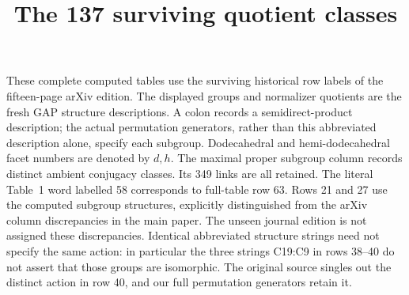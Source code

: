 \documentclass[10pt,a4paper]{article}
\title{The 137 surviving quotient classes}
\author{}\date{}
\begin{document}
\maketitle
These complete computed tables use the surviving historical row labels of the fifteen-page arXiv edition. The displayed groups and normalizer quotients are the fresh GAP structure descriptions. A colon records a semidirect-product description; the actual permutation generators, rather than this abbreviated description alone, specify each subgroup. Dodecahedral and hemi-dodecahedral facet numbers are denoted by $d,h$. The maximal proper subgroup column records distinct ambient conjugacy classes. Its 349 links are all retained. The literal Table~1 word labelled 58 corresponds to full-table row 63. Rows 21 and 27 use the computed subgroup structures, explicitly distinguished from the arXiv column discrepancies in the main paper. The unseen journal edition is not assigned these discrepancies. Identical abbreviated structure strings need not specify the same action: in particular the three strings C19:C9 in rows 38--40 do not assert that those groups are isomorphic. The original source singles out the distinct action in row 40, and our full permutation generators retain it.
\end{document}

